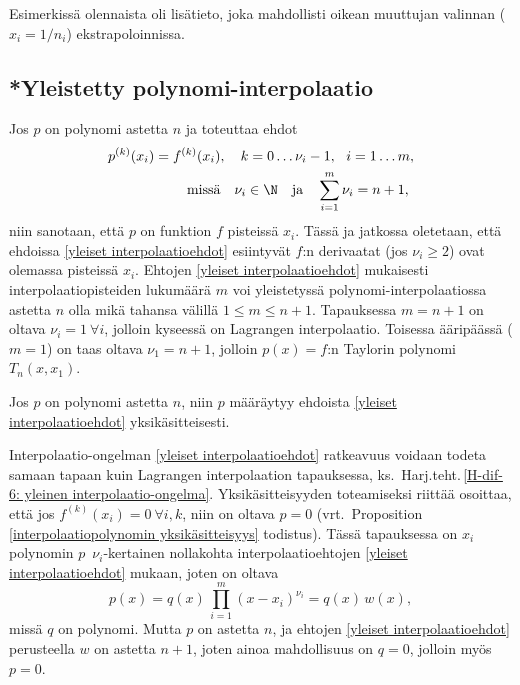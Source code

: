 Esimerkissä olennaista oli lisätieto, joka mahdollisti oikean muuttujan valinnan ($x_i=1/n_i$)
ekstrapoloinnissa.

\subsection*{*Yleistetty polynomi-interpolaatio}

Jos $p$ on polynomi astetta $n$ ja toteuttaa ehdot
\begin{equation} \label{yleiset interpolaatioehdot} 
\begin{aligned}
p^{(k)}(x_i)&= f^{(k)}(x_i),\quad k=0\ldots\nu_i-1,\ \ i=1\ldots m, \\ 
           &\qquad\ \text{missä}\quad \nu_i \in \N \quad \text{ja} \quad \sum_{i=1}^m \nu_i=n+1,
\end{aligned} \end{equation}
niin sanotaan, että $p$ on funktion $f$  pisteissä
$x_i$. Tässä ja jatkossa oletetaan, että ehdoissa \eqref{yleiset interpolaatioehdot}
esiintyvät $f$:n derivaatat (jos $\nu_i \ge 2$) ovat olemassa pisteissä $x_i$. Ehtojen
\eqref{yleiset interpolaatioehdot} mukaisesti interpolaatiopisteiden lukumäärä $m$ voi
yleistetyssä polynomi-interpolaatiossa astetta $n$ olla mikä tahansa välillä $1 \le m \le n+1$.
Tapauksessa $m=n+1$ on oltava $\nu_i=1\ \forall i$, jolloin kyseessä on Lagrangen
interpolaatio. Toisessa ääripäässä ($m=1$) on taas oltava $\nu_1=n+1$, jolloin $p(x)=f$:n
Taylorin polynomi $T_n(x,x_1)$.
\begin{Prop} Jos $p$ on polynomi astetta $n$, niin $p$ määräytyy ehdoista 
\eqref{yleiset interpolaatioehdot} yksikäsitteisesti. 
\end{Prop}
\tod Interpolaatio-ongelman \eqref{yleiset interpolaatioehdot} ratkeavuus voidaan todeta
samaan tapaan kuin Lagrangen interpolaation tapauksessa, ks.\
Harj.teht.\,\ref{H-dif-6: yleinen interpolaatio-ongelma}. Yksikäsitteisyyden toteamiseksi
riittää osoittaa, että jos $f^{(k)}(x_i)=0\ \forall i,k$, niin on oltava $p=0$
(vrt.\ Proposition \ref{interpolaatiopolynomin yksikäsitteisyys} todistus). Tässä tapauksessa
on $x_i$  polynomin $p$ $\,\nu_i$-kertainen nollakohta interpolaatioehtojen
\eqref{yleiset interpolaatioehdot} mukaan, joten on oltava
\[ 
p(x) = q(x)\,\prod_{i=1}^m (x-x_i)^{\nu_i} = q(x)\,w(x), 
\]
missä $q$ on polynomi. Mutta $p$ on astetta $n$, ja ehtojen \eqref{yleiset interpolaatioehdot}
perusteella $w$ on astetta $n+1$, joten ainoa mahdollisuus on $q=0$, jolloin myös $p=0$.
\loppu

